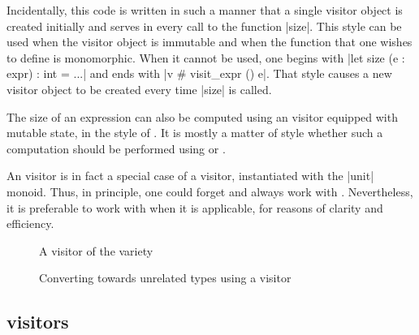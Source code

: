 \documentclass[11pt,a4paper,twoside]{article}
\begin{document}
Incidentally, this code is written in such a manner that a single visitor
object is created initially and serves in every call to the function
\oc|size|. This style can be used when the visitor object is immutable and
when the function that one wishes to define is monomorphic. When it cannot be
used, one begins with \oc|let size (e : expr) : int = ...| and ends with %
\oc|v # visit_expr () e|. That style causes a new visitor object to be created
every time \oc|size| is called.

The size of an expression can also be computed using an \iter visitor equipped
with mutable state, in the style of . It is mostly a matter
of style whether such a computation should be performed using \iter or
\reduce.

An \iter visitor is in fact a special case of a \reduce visitor, instantiated
with the \oc|unit| monoid. Thus, in principle, one could forget \iter and
always work with \reduce. Nevertheless, it is preferable to work with \iter
when it is applicable, for reasons of clarity and efficiency.



\begin{figure}[p]
\vspace{-\baselineskip}
\caption{A visitor of the \fold variety}
\label{fig:expr00fold}
\end{figure}

\begin{figure}[p]
\caption{Converting towards unrelated types using a \fold visitor}
\label{fig:fold}
\end{figure}

\subsection{\fold visitors}
\label{sec:intro:fold}
\end{document}
